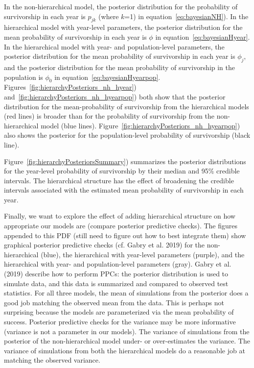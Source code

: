 \documentclass[12pt, oneside, titlepage]{article}   	%
\begin{document}
In the non-hierarchical model, the posterior distribution for the probability of survivorship in each year is $p_{jk}$ (where $k$=1) in equation~\eqref{eq:bayesianNH}). In the hierarchical model with year-level parameters, the posterior distribution for the mean probability of survivorship in each year is $\phi$ in equation~\eqref{eq:bayesianHyear}. In the hierarchical model with year- and population-level parameters, the posterior distribution for the mean probability of survivorship in each year is $\phi_j$, and the posterior distribution for the mean probability of survivorship in the population is $\phi_0$ in equation~\eqref{eq:bayesianHyearpop}. Figures~\ref{fig:hierarchyPosteriors_nh_hyear}) and~\ref{fig:hierarchyPosteriors_nh_hyearpop}) both show that the posterior distribution for the mean-probability of survivorship from the hierarchical models (red lines) is broader than for the probability of survivorship from the non-hierarchical model (blue lines). Figure~\ref{fig:hierarchyPosteriors_nh_hyearpop}) also shows the posterior for the population-level probability of survivorship (black line).

Figure~\ref{fig:hierarchyPosteriorsSummary}) summarizes the posterior distributions for the year-level probability of survivorship by their median and 95\% credible intervals. The hierarchical structure has the effect of broadening the credible intervals associated with the estimated mean probability of survivorship in each year. 
 
Finally, we want to explore the effect of adding hierarchical structure on how appropriate our models are (compare posterior predictive checks). The figures appended to this PDF (still need to figure out how to best integrate them) show graphical posterior predictive checks (cf. Gabry et al. 2019) for the non-hierarchical (blue), the hierarchical with year-level parameters (purple), and the hierarchical with year- and population-level parameters (gray). Gabry et al. (2019) describe how to perform PPCs: the posterior distribution is used to  simulate data, and this data is summarized and compared to observed test statistics. For all three models, the mean of simulations from the posterior does a good job matching the observed mean from the data. This is perhaps not surprising because the models are parameterized via the mean probability of success. Posterior predictive checks for the variance may be more informative (variance is not a parameter in our models). The variance of simulations from the posterior of the non-hierarchical model under- or over-estimates the variance. The variance of simulations from both the hierarchical models do a reasonable job at matching the observed variance. 
\end{document}
